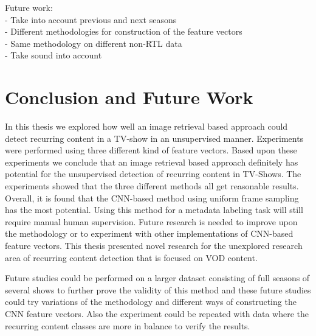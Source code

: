 \documentclass{report}
\begin{document}
Future work: \\
- Take into account previous and next seasons\\
- Different methodologies for construction of the feature vectors\\
- Same methodology on different non-RTL data\\
- Take sound into account
\fi


\chapter{Conclusion and Future Work} \label{conclusion}
In this thesis we explored how well an image retrieval based approach could detect recurring content in a TV-show in an unsupervised manner. Experiments were performed using three different kind of feature vectors. Based upon these experiments we conclude that an image retrieval based approach definitely has potential for the unsupervised detection of recurring content in TV-Shows. The experiments showed that the three different methods all get reasonable results. Overall, it is found that the CNN-based method using uniform frame sampling has the most potential. Using this method for a metadata labeling task will still require manual human supervision. Future research is needed to improve upon the methodology or to experiment with other implementations of CNN-based feature vectors. This thesis presented novel research for the unexplored research area of recurring content detection that is focused on VOD content.

Future studies could be performed on a larger dataset consisting of full seasons of several shows to further prove the validity of this method and these future studies could try variations of the methodology and different ways of constructing the CNN feature vectors. Also the experiment could be repeated with data where the recurring content classes are more in balance to verify the results.

\end{document}
